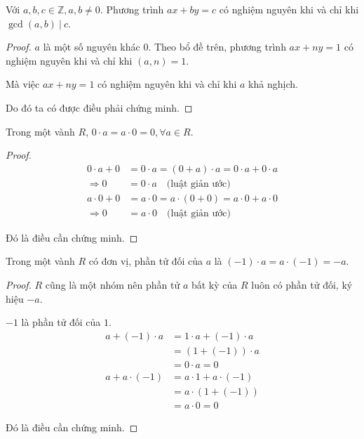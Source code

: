 \documentclass[class=linearalgebra,crop=false]{standalone}
\begin{document}
\begin{lemma}Với $a, b, c \in \mathbb{Z}, a, b\ne 0$. Phương trình $ax + by = c$ có nghiệm nguyên khi và chỉ khi $\gcd(a, b)\ |\ c$.
\end{lemma}

\begin{proof}$a$ là một số nguyên khác $0$. Theo bổ đề trên, phương trình $ax + ny = 1$ có nghiệm nguyên khi và chỉ khi $(a, n) = 1$.
    \par Mà việc $ax + ny = 1$ có nghiệm nguyên khi và chỉ khi $a$ khả nghịch.
    \par Do đó ta có được điều phải chứng minh.
\end{proof}

\begin{lemma}Trong một vành $R$, $0\cdot a = a\cdot 0 = 0, \forall a\in R$.
\end{lemma}

\begin{proof}
    \begin{align*}
        0\cdot a + 0 &= 0\cdot a = (0 + a)\cdot a = 0\cdot a + 0\cdot a \\
        \Rightarrow 0 &= 0\cdot a\quad\text{(luật giản ước)}
    \end{align*}
    \begin{align*}
        a\cdot 0 + 0 &= a\cdot 0 = a\cdot (0 + 0) = a\cdot 0 + a\cdot 0 \\
        \Rightarrow 0 &= a\cdot 0\quad\text{(luật giản ước)}
    \end{align*}
    \par Đó là điều cần chứng minh.
\end{proof}

\begin{lemma}Trong một vành $R$ có đơn vị, phần tử đối của $a$ là $(-1)\cdot a = a\cdot(-1) = -a$.
\end{lemma}

\begin{proof}$R$ cũng là một nhóm nên phần tử $a$ bất kỳ của $R$ luôn có phần tử đối, ký hiệu $-a$.
    \par $-1$ là phần tử đối của $1$.
    \begin{align*}
        a + (-1)\cdot a &= 1\cdot a + (-1)\cdot a \\
                        &= (1 + (-1))\cdot a \\
                        &= 0\cdot a = 0 \\
        a + a\cdot (-1) &= a\cdot 1 + a\cdot (-1) \\
                        &= a\cdot (1 + (-1)) \\
                        &= a\cdot 0 = 0
    \end{align*}
    \par Đó là điều cần chứng minh.
\end{proof}
\end{document}

